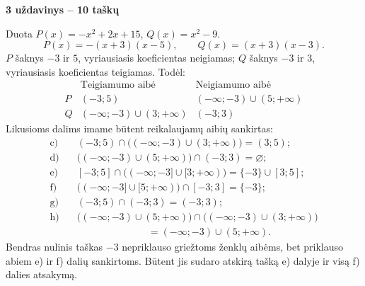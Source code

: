 \documentclass[11pt]{article}
\newcommand{\sk}[1]{\par\medskip\textbf{#1}\par}
\begin{document}
\sk{3 uždavinys -- 10 taškų}
Duota $P(x)=- x^{2} + 2 x + 15$, $Q(x)=x^{2} - 9$.
\[P(x)=-(x+3)(x-5),\qquad Q(x)=(x+3)(x-3).\]
$P$ šaknys $-3$ ir $5$, vyriausiasis koeficientas neigiamas; $Q$ šaknys $-3$ ir $3$, vyriausiasis koeficientas teigiamas. Todėl:
\[\begin{array}{lll} &\text{Teigiamumo aibė}&\text{Neigiamumo aibė}\\
P&(-3;5)&(-\infty;-3)\cup(5;+\infty)\\
Q&(-\infty;-3)\cup(3;+\infty)&(-3;3)
\end{array}\]
Likusioms dalims imame būtent reikalaujamų aibių sankirtas:
\begin{align*}
\text{c)}\quad &(-3;5)\cap\bigl((-\infty;-3)\cup(3;+\infty)\bigr)=(3;5);\\
\text{d)}\quad &\bigl((-\infty;-3)\cup(5;+\infty)\bigr)\cap(-3;3)=\varnothing;\\
\text{e)}\quad &[-3;5]\cap\bigl((-\infty;-3]\cup[3;+\infty)\bigr)=\{-3\}\cup[3;5];\\
\text{f)}\quad &\bigl((-\infty;-3]\cup[5;+\infty)\bigr)\cap[-3;3]=\{-3\};\\
\text{g)}\quad &(-3;5)\cap(-3;3)=(-3;3);\\
\text{h)}\quad &\bigl((-\infty;-3)\cup(5;+\infty)\bigr)\cap\bigl((-\infty;-3)\cup(3;+\infty)\bigr)\\
&\hspace{3cm}=(-\infty;-3)\cup(5;+\infty).
\end{align*}
Bendras nulinis taškas $-3$ nepriklauso griežtoms ženklų aibėms, bet priklauso abiem e) ir f) dalių sankirtoms. Būtent jis sudaro atskirą tašką e) dalyje ir visą f) dalies atsakymą.
\end{document}
